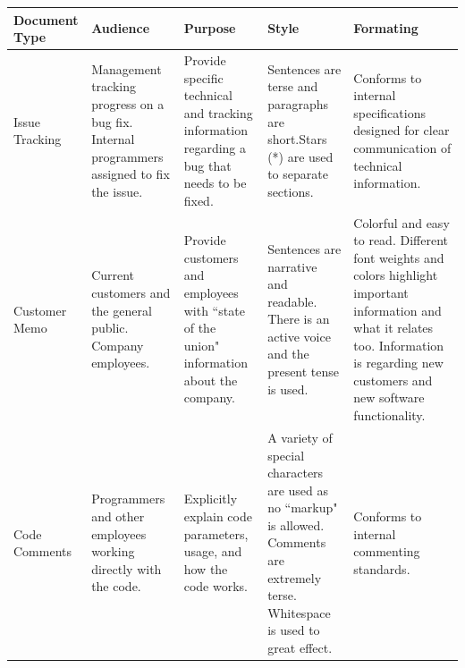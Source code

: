 \documentclass[prodmode,acmtecs]{acmsmall} %
\begin{document}
{\renewcommand{\arraystretch}{1.5}
\begin{table}[!t]
    {\begin{tabularx}{\textwidth}{ | p{.6 in} | X | X | X | X |}
        \hline
         \textbf{Document Type} & \textbf{Audience}  & \textbf{Purpose} & \textbf{Style} & \textbf{Formating} \\ \hline

        Issue \newline Tracking & Management tracking progress on a bug fix. \newline \newline Internal programmers assigned to fix the issue.  & Provide specific technical and tracking information regarding a bug that needs to be fixed. & Sentences are terse and paragraphs are short.\newline \newline  Stars (*) are used to separate sections.  \newline \newline  & Conforms to internal specifications designed for clear communication of technical information.  \\ \hline 

        Customer \newline Memo & Current customers and the general public. \newline \newline Company employees. & Provide customers and employees with ``state of the union" information about the company. & Sentences are narrative and readable. \newline \newline There is an active voice and the present tense is used. & Colorful and easy to read. \newline \newline  Different font weights and colors highlight important information and what it relates too.  \newline \newline Information is regarding new customers and new software functionality.  \\ \hline
        
        Code \newline Comments & Programmers and other employees working directly with the code. & Explicitly explain code parameters, usage, and how the code works. & A variety of special characters are used as no ``markup" is allowed. \newline \newline  Comments are extremely terse.  Whitespace is used to great effect. &  Conforms to internal commenting standards. \\ \hline
    \end{tabularx}}
\end{table}
\FloatBarrier

}
\end{document}
